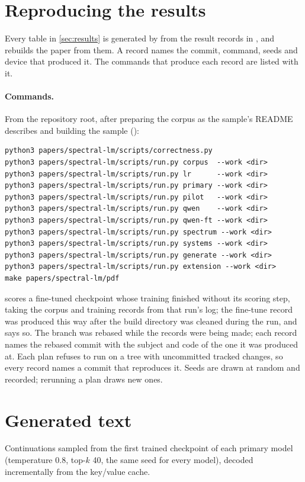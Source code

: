 
\appendix
\section{Reproducing the results}
\label{sec:repro}

Every table in \cref{sec:results} is generated by
 from the result records in
, and 
rebuilds the paper from them. A record names the commit, command, seeds and
device that produced it. The commands that produce each record are listed
with it.

\paragraph{Commands.} From the repository root, after preparing the corpus as
the sample's README describes and building the sample
():
\begin{verbatim}
python3 papers/spectral-lm/scripts/correctness.py
python3 papers/spectral-lm/scripts/run.py corpus  --work <dir>
python3 papers/spectral-lm/scripts/run.py lr      --work <dir>
python3 papers/spectral-lm/scripts/run.py primary --work <dir>
python3 papers/spectral-lm/scripts/run.py pilot   --work <dir>
python3 papers/spectral-lm/scripts/run.py qwen    --work <dir>
python3 papers/spectral-lm/scripts/run.py qwen-ft --work <dir>
python3 papers/spectral-lm/scripts/run.py spectrum --work <dir>
python3 papers/spectral-lm/scripts/run.py systems --work <dir>
python3 papers/spectral-lm/scripts/run.py generate --work <dir>
python3 papers/spectral-lm/scripts/run.py extension --work <dir>
make papers/spectral-lm/pdf
\end{verbatim}
 scores a fine-tuned checkpoint whose
training finished without its scoring step, taking the corpus and training
records from that run's log; the fine-tune record was produced this way after
the build directory was cleaned during the run, and says so. The branch was
rebased while the records were being made; each record names the rebased
commit with the subject and code of the one it was produced at.
Each plan refuses to run on a tree with uncommitted tracked changes, so every
record names a commit that reproduces it. Seeds are drawn at random and
recorded; rerunning a plan draws new ones.

\section{Generated text}
\label{sec:samples}

Continuations sampled from the first trained checkpoint of each primary
model (temperature 0.8, top-$k$ 40, the same seed for every model), decoded
incrementally from the key/value cache.


